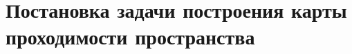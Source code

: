 


\section{Постановка задачи построения карты проходимости пространства}\label{sec:map_description}

